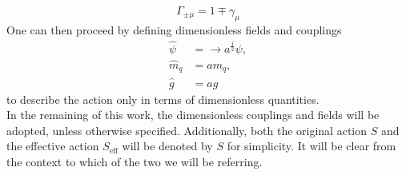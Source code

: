 \begin{equation*}
    \Gamma_{\pm \mu} = 1 \mp \gamma_\mu 
\end{equation*}
One can then proceed by defining dimensionless fields and couplings
\begin{equation*}
    \begin{aligned}
        \hat\psi &= \rightarrow a^{\frac{1}{2}} \psi, \\
        \hat m_q &= a m_q, \\
        \hat g &= a g
    \end{aligned}
    \label{eq:fermionic_theory_dimless_redefinitions}
\end{equation*}
to describe the action only in terms of dimensionless quantities. \\
In the remaining of this work, the dimensionless couplings and fields will be adopted, unless otherwise specified. Additionally, both the original action $S$ and the effective action $S_\text{eff}$ will be denoted by $S$ for simplicity. It will be clear from the context to which of the two we will be referring. \\


